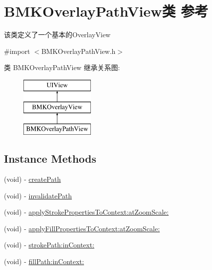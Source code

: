 \hypertarget{interface_b_m_k_overlay_path_view}{}\section{B\+M\+K\+Overlay\+Path\+View类 参考}
\label{interface_b_m_k_overlay_path_view}


该类定义了一个基本的\+Overlay\+View  




{\ttfamily \#import $<$B\+M\+K\+Overlay\+Path\+View.\+h$>$}

类 B\+M\+K\+Overlay\+Path\+View 继承关系图\+:\begin{figure}[H]
\begin{center}
\leavevmode
\includegraphics[height=3.000000cm]{interface_b_m_k_overlay_path_view}
\end{center}
\end{figure}
\subsection*{Instance Methods}
\begin{DoxyCompactItemize}
\item 
(void) -\/ \hyperlink{interface_b_m_k_overlay_path_view_a4e76c3b9524b555c2118ae18f6057605}{create\+Path}
\item 
(void) -\/ \hyperlink{interface_b_m_k_overlay_path_view_ac773bae0823405dcf5b78a3361fa2d56}{invalidate\+Path}
\item 
(void) -\/ \hyperlink{interface_b_m_k_overlay_path_view_a2acbf6bd9401c2904148b7b6cf85c6e9}{apply\+Stroke\+Properties\+To\+Context\+:at\+Zoom\+Scale\+:}
\item 
(void) -\/ \hyperlink{interface_b_m_k_overlay_path_view_af549bea37a94164a088826f9a962e08c}{apply\+Fill\+Properties\+To\+Context\+:at\+Zoom\+Scale\+:}
\item 
(void) -\/ \hyperlink{interface_b_m_k_overlay_path_view_a482e5fe24f04335d090b32d449ef6dc4}{stroke\+Path\+:in\+Context\+:}
\item 
(void) -\/ \hyperlink{interface_b_m_k_overlay_path_view_a036abde24b9ae921f209cde884dad49b}{fill\+Path\+:in\+Context\+:}
\end{DoxyCompactItemize}
